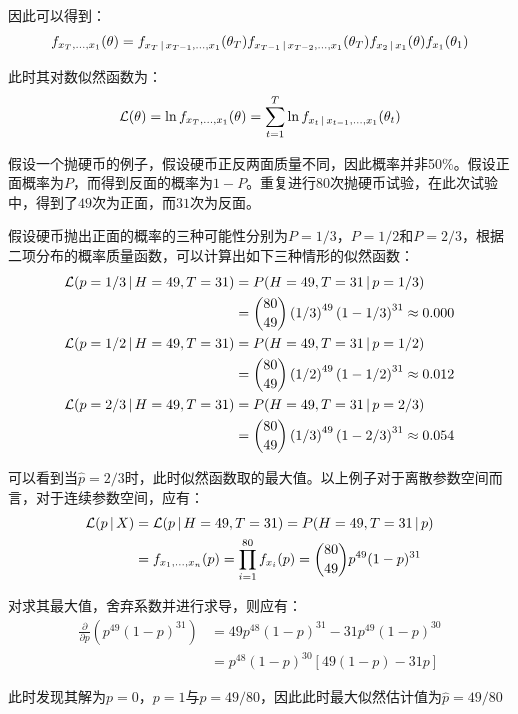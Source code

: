 \documentclass[11pt]{article}
\begin{document}
因此可以得到：
\begin{equation*}
    f_{x_T,\dots,x_1}(\theta) =
    f_{x_{T} \,\vert\, x_{T-1},\dots,x_1}(\theta_T)
    f_{x_{T-1} \,\vert\, x_{T-2},\dots,x_1}(\theta_T)
    f_{x_{2} \,\vert\, x_1}(\theta) f_{x_1}(\theta_1)
\end{equation*}

此时其对数似然函数为：
\begin{equation*}
    \mathcal{L}(\theta) = \ln f_{x_T,\dots,x_1}(\theta)
    = \sum_{t=1}^{T} \ln f_{x_t \,\vert\, x_{t-1},\dots,x_1}(\theta_t)
\end{equation*}

\begin{example}
    假设一个抛硬币的例子，假设硬币正反两面质量不同，因此概率并非50\%。假设正面概率为$P$，而得到反面的概率为$1-P$。重复进行80次抛硬币试验，在此次试验中，得到了$49$次为正面，而$31$次为反面。

    假设硬币抛出正面的概率的三种可能性分别为$P=1/3$，$P=1/2$和$P=2/3$，根据二项分布的概率质量函数，可以计算出如下三种情形的似然函数：
    \begin{align*}
        \mathcal{L}(p=1/3 \,\vert\, H=49, T=31) &= P(H=49, T=31 \,\vert\, p = 1/3) \\
        &= \binom{80}{49} \left(1/3\right)^{49} \left(1-1/3\right)^{31} \approx 0.000 \\
        \mathcal{L}(p=1/2 \,\vert\, H=49, T=31) &= P(H=49, T=31 \,\vert\, p = 1/2) \\
        &= \binom{80}{49} \left(1/2\right)^{49} \left(1-1/2\right)^{31} \approx 0.012 \\
        \mathcal{L}(p=2/3 \,\vert\, H=49, T=31) &= P(H=49, T=31 \,\vert\, p = 2/3) \\
        &= \binom{80}{49} \left(1/3\right)^{49} \left(1-2/3\right)^{31} \approx 0.054
    \end{align*}

    可以看到当$\hat{p} = 2/3$时，此时似然函数取的最大值。以上例子对于离散参数空间而言，对于连续参数空间，应有：
    \begin{align*}
        \mathcal{L}(p \,\vert\, X) &= \mathcal{L}(p \,\vert\, H=49,T=31) = P(H=49,T=31 \,\vert\, p) \\
        &= f_{x_1,\dots,x_n} (p) = \prod_{i=1}^{80} f_{x_i}(p) = \binom{80}{49}p^{49}(1-p)^{31}
    \end{align*}

    对求其最大值，舍弃系数并进行求导，则应有：
    \begin{align*}
        \frac{\partial}{\partial p} \left( p^{49}(1-p)^{31} \right)
        &= 49p^{48}(1-p)^{31} - 31p^{49}(1-p)^{30} \\
        &= p^{48}(1-p)^{30}\left[49(1-p) - 31p\right]
    \end{align*}

    此时发现其解为$p=0$，$p=1$与$p=49/80$，因此此时最大似然估计值为$\hat{p} = 49/80$
\end{example}
\end{document}
